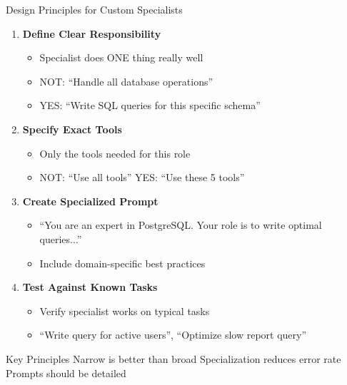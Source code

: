 \documentclass[aspectratio=169, 11pt]{beamer}
\begin{document}
\begin{frame}{Design Principles for Custom Specialists}
    \begin{enumerate}
        \item \textbf{Define Clear Responsibility}
        \begin{itemize}
            \item Specialist does ONE thing really well
            \item NOT: ``Handle all database operations''
            \item YES: ``Write SQL queries for this specific schema''
        \end{itemize}

        \item \textbf{Specify Exact Tools}
        \begin{itemize}
            \item Only the tools needed for this role
            \item NOT: ``Use all tools'' \quad YES: ``Use these 5 tools''
        \end{itemize}

        \item \textbf{Create Specialized Prompt}
        \begin{itemize}
            \item ``You are an expert in PostgreSQL. Your role is to write optimal queries...''
            \item Include domain-specific best practices
        \end{itemize}

        \item \textbf{Test Against Known Tasks}
        \begin{itemize}
            \item Verify specialist works on typical tasks
            \item ``Write query for active users'', ``Optimize slow report query''
        \end{itemize}
    \end{enumerate}

    \vspace{0.3cm}
    \begin{block}{Key Principles}
        Narrow is better than broad \quad\quad Specialization reduces error rate \quad\quad Prompts should be detailed
    \end{block}

\end{frame}
\end{document}
